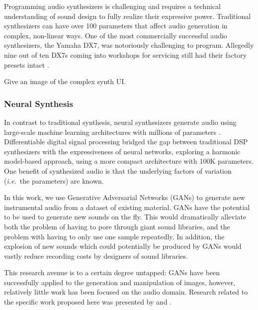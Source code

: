 Programming audio synthesizers is challenging and requires a technical understanding of sound design to fully realize their expressive power. Traditional synthesizers can have over 100 parameters that affect audio generation in complex, non-linear ways. One of the most commercially successful audio synthesizers, the Yamaha DX7, was notoriously challenging to program. Allegedly nine out of ten DX7s coming into workshops for servicing still had their factory presets intact \cite{seago2004critical}.

Give an image of the complex synth UI.

\subsubsection{Neural Synthesis}
In contrast to traditional synthesis, neural synthesizers generate audio using large-scale machine learning architectures with millions of parameters \cite{engel2017neural}. Differentiable digital signal processing \cite{engel2020ddsp} bridged the gap between traditional DSP synthesizers with the expressiveness of neural networks, exploring a harmonic model-based approach, using a more compact architecture with 100K parameters.
One benefit of synthesized audio is that the underlying factors of variation ({\em i.e.}~the parameters) are known.

In this work, we use Generative Adversarial Networks (GANs) \cite{goodfellow2014generative} to generate new instrumental audio from a dataset of existing material. GANs have the potential to be used to generate new sounds on the fly. This would dramatically alleviate both the problem of having to pore through giant sound libraries, and the problem with having to only use one sample repeatedly. In addition, the explosion of new sounds which could potentially be produced by GANs would vastly reduce recording costs by designers of sound libraries.

This research avenue is to a certain degree untapped: GANs have been successfully applied to the generation and manipulation of images, however, relatively little work has been focused on the audio domain. Research related to the specific work proposed here was presented by \cite{donahue2018adversarial}  and \cite{engel2018gansynth}.

